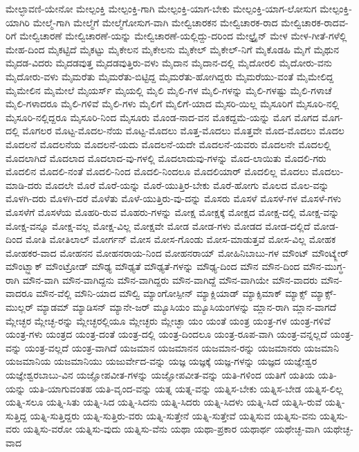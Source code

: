 {ಮೇಲ್ಛಾವಣಿ-ಯೇನೋ
ಮೇಲ್ಪಂಕ್ತಿ
ಮೇಲ್ಪಂಕ್ತಿ-ಗಾಗಿ
ಮೇಲ್ಪಂಕ್ತಿ-ಯಾಗ-ಬೇಕು
ಮೇಲ್ಪಂಕ್ತಿ-ಯಾಗ-ಲೋಸುಗ
ಮೇಲ್ಪಂಕ್ತಿ-ಯಾಗಿರಿ
ಮೇಲ್ಮೆ-ಗಾಗಿ
ಮೇಲ್ಮೆಗೆ
ಮೇಲ್ಮೆಗೋಸುಗ-ವಾಗಿ
ಮೇಲ್ವಿಚಾರಕನ
ಮೇಲ್ವಿಚಾರಕ-ರಾದ
ಮೇಲ್ವಿಚಾರಕ-ರಾದವ-ರಿಗೆ
ಮೇಲ್ವಿಚಾರಣೆ
ಮೇಲ್ವಿಚಾರಣೆ-ಯನ್ನು
ಮೇಲ್ವಿಚಾರಣೆ-ಯಲ್ಲಿದ್ದು-ದರಿಂದ
ಮೇಲ್ಟ್ರೈನ್
ಮೇಳ
ಮೇಳ-ಗೀತೆ-ಗಳೆಲ್ಲಿ
ಮೇಹ-ದಿಂದ
ಮೈಕಟ್ಟಿದೆ
ಮೈಕಟ್ಟು
ಮೈಕೇಲನ
ಮೈಕೇಲನು
ಮೈಕೇಲ್
ಮೈಕೇಲ್-ನಿಗೆ
ಮೈಕೊಡಹಿ
ಮೈಗೆ
ಮೈಥುನ
ಮೈದಡ-ವಿದರು
ಮೈದಡವುತ್ತ
ಮೈದಡವುತ್ತಿರು-ವಳು
ಮೈದಾನ
ಮೈದಾನ-ದಲ್ಲಿ
ಮೈದೋರಲಿ
ಮೈದೋರು-ವನು
ಮೈದೋರು-ವಳು
ಮೈಮರೆತು
ಮೈಮರೆತು-ಬಿಟ್ಟಿದ್ದ
ಮೈಮರೆತು-ಹೋಗಿದ್ದರು
ಮೈಮರೆಯು-ವಂತೆ
ಮೈಮೇಲಿದ್ದ
ಮೈಮೇಲಿನ
ಮೈಮೇಲೆ
ಮೈಯರ್ಸ್
ಮೈಯಲ್ಲಿ
ಮೈಲಿ
ಮೈಲಿ-ಗಳ
ಮೈಲಿ-ಗಳನ್ನು
ಮೈಲಿ-ಗಳಷ್ಟು
ಮೈಲಿ-ಗಳಾಚೆ
ಮೈಲಿ-ಗಳಾದರೂ
ಮೈಲಿ-ಗಳಿವೆ
ಮೈಲಿ-ಗಳು
ಮೈಲಿಗೆ
ಮೈಲಿಗೆ-ಯಾದ
ಮೈಸರಿ-ಯಿಲ್ಲ
ಮೈಸೂರಿಗೆ
ಮೈಸೂರಿ-ನಲ್ಲಿ
ಮೈಸೂರಿ-ನಲ್ಲಿದ್ದರೂ
ಮೈಸೂರಿ-ನಿಂದ
ಮೈಸೂರು
ಮೊಂಡ-ನಾದ-ವನ
ಮೊಕದ್ದಮೆ-ಯನ್ನು
ಮೊಗ
ಮೊಗದ
ಮೊಗ-ದಲ್ಲಿ
ಮೊಗಲರ
ಮೊಟ್ಟ-ಮೊದಲ-ನೆಯ
ಮೊಟ್ಟ-ಮೊದಲು
ಮೊತ್ತ-ಮೊದಲು
ಮೊತ್ತವೇ
ಮೊದ-ಮೊದಲು
ಮೊದಲ
ಮೊದಲನೆ
ಮೊದಲನೆಯ
ಮೊದಲನೆ-ಯದು
ಮೊದಲನೆ-ಯದೇ
ಮೊದಲನೆ-ಯವರು
ಮೊದಲನೇ
ಮೊದಲಲ್ಲಿ
ಮೊದಲಾಗಿದೆ
ಮೊದಲಾದ
ಮೊದಲಾದ-ವು-ಗಳಲ್ಲಿ
ಮೊದಲಾದುವು-ಗಳನ್ನು
ಮೊದ-ಲಾಯಿತು
ಮೊದಲಿ-ಗರು
ಮೊದಲಿನ
ಮೊದಲಿ-ನಂತೆ
ಮೊದಲಿ-ನಿಂದ
ಮೊದಲಿ-ನಿಂದಲೂ
ಮೊದಲಿಯಾರ್
ಮೊದಲಿಲ್ಲ
ಮೊದಲು
ಮೊದಲು-ಮಾಡಿ-ದರು
ಮೊದಲೇ
ಮೊರೆ
ಮೊರೆ-ಯನ್ನು
ಮೊರೆ-ಯುತ್ತಿರ-ಬೇಕು
ಮೊರೆ-ಹೋಗು
ಮೊಲದ
ಮೊಲ-ವನ್ನು
ಮೊಳಗಿ-ದರು
ಮೊಳಗಿ-ದರೆ
ಮೊಳೆತು
ಮೊಳೆ-ಯುತ್ತಿರು-ವು-ದನ್ನು
ಮೊಸರು
ಮೊಸಳೆ
ಮೊಸಳೆ-ಗಳ
ಮೊಸಳೆ-ಗಳು
ಮೊಸಳೆಗೆ
ಮೊಸಳೆಯ
ಮೊಹರಿ-ರುವ
ಮೊಹರು-ಗಳನ್ನು
ಮೋಕ್ಷ
ಮೋಕ್ಷಕ್ಕೆ
ಮೋಕ್ಷದ
ಮೋಕ್ಷ-ದಲ್ಲಿ
ಮೋಕ್ಷ-ವನ್ನು
ಮೋಕ್ಷ-ವನ್ನೂ
ಮೋಕ್ಷ-ವಲ್ಲ
ಮೋಕ್ಷ-ವಿಲ್ಲ
ಮೋಕ್ಷವೇ
ಮೋಡ
ಮೋಡ-ಗಳು
ಮೋಡದ
ಮೋಡ-ದಲ್ಲಿದೆ
ಮೋಡ-ದಿಂದ
ಮೋತಿ
ಮೋತಿಲಾಲ್
ಮೋರ್ಗನ್
ಮೋಸ
ಮೋಸ-ಗೊಂಡು
ಮೋಸ-ಮಾಡುತ್ತವೆ
ಮೋಸ-ವಿಲ್ಲ
ಮೋಹಕ
ಮೋಹಕರ-ವಾದ
ಮೋಹನನ
ಮೋಹನರಾಯ-ನಿಂದ
ಮೋಹನರಾಯ್
ಮೋಹಿನಿಬಾಬು-ಗಳ
ಮೌಂಟ್
ಮೌಂಟ್ಕ್ಲೇರ್
ಮೌಂಟ್ಬ್ಲಾಕ್
ಮೌಂಟ್ರೋಡ್
ಮೌಢ್ಯ
ಮೌಢ್ಯತೆ
ಮೌಢ್ಯತೆ-ಗಳನ್ನು
ಮೌಢ್ಯ-ದಿಂದ
ಮೌನ
ಮೌನ-ದಿಂದ
ಮೌನ-ಮುಗ್ಧ-ರಾಗಿ
ಮೌನ-ವಾಗಿ
ಮೌನ-ವಾಗಿದ್ದನು
ಮೌನ-ವಾಗಿದ್ದರು
ಮೌನ-ವಾಗಿದ್ದೆ
ಮೌನ-ವಾಗಿಯೇ
ಮೌನ-ವಾದರು
ಮೌನ-ವಾದರೂ
ಮೌನ-ವೆಲ್ಲಿ
ಮೌನಿ-ಯಾದ
ಮೌಲ್ವಿ
ಮ್ಯಾಂಗೋಸ್ಪೀನ್
ಮ್ಯಾಕ್ಲಿಯಾಡ್
ಮ್ಯಾಕ್ಸಿಮಾಕ್
ಮ್ಯಾಕ್ಸ್
ಮ್ಯಾಕ್ಸ್-ಮುಲ್ಲರ್
ಮ್ಯಾಡಮ್
ಮ್ಯಾಡಿಸನ್
ಮ್ಯಾನೇ-ಜರ್
ಮ್ಯೂಸಿಯಂ
ಮ್ಯೂಸಿಯಂಗಳನ್ನು
ಮ್ಲಾನ-ರಾಗಿ
ಮ್ಲಾನ-ವಾಗದೆ
ಮ್ಲೇಚ್ಛರ
ಮ್ಲೇಚ್ಛ-ರನ್ನು
ಮ್ಲೇಚ್ಛರಲ್ಲಿಯೂ
ಮ್ಲೇಚ್ಛರು
ಮ್ಲೇಚ್ಛಾ
ಯಂ
ಯಂತೆ
ಯಂತ್ರ
ಯಂತ್ರ-ಗಳ
ಯಂತ್ರ-ಗಳಿವೆ
ಯಂತ್ರ-ಗಳು
ಯಂತ್ರದ
ಯಂತ್ರ-ದಂತೆ
ಯಂತ್ರ-ದಲ್ಲಿ
ಯಂತ್ರ-ದಿಂದಲೂ
ಯಂತ್ರ-ರೂಪ-ವಾಗಿ
ಯಂತ್ರ-ವನ್ನಲ್ಲದೆ
ಯಂತ್ರ-ವನ್ನು
ಯಂತ್ರ-ವಲ್ಲದೆ
ಯಂತ್ರ-ವಾಗಿದೆ
ಯಜಮಾನ
ಯಜಮಾನನ
ಯಜಮಾನ-ರನ್ನು
ಯಜಮಾನರು
ಯಜಮಾನಿ
ಯಜಮಾನಿಯ
ಯಜಮಾನಿಯು
ಯಜುರ್ವೇದ-ವನ್ನು
ಯಜ್ಞ
ಯಜ್ಞಕ್ಕೆ
ಯಜ್ಞ-ಗಳನ್ನು
ಯಜ್ಞದ
ಯಜ್ಞೇಶ್ವರ
ಯಜ್ಞೇಶ್ವರಬಾಬು-ವಿನ
ಯಜ್ಞೋಪವೀತ-ಗಳನ್ನು
ಯಜ್ಞೋಪವೀತ-ವನ್ನು
ಯತಿ-ಗಳಿಂದ
ಯತಿಗೆ
ಯತಿಯ
ಯತಿ-ಯನ್ನು
ಯತಿ-ಯಾಗುವಂತಹ
ಯತಿ-ವೃಂದ-ವನ್ನು
ಯತ್ನ
ಯತ್ನ-ವನ್ನು
ಯತ್ನಿಸ-ಬೇಕು
ಯತ್ನಿಸ-ಬೇಡ
ಯತ್ನಿಸ-ಲಿಲ್ಲ
ಯತ್ನಿ-ಸಲೂ
ಯತ್ನಿ-ಸಿತು
ಯತ್ನಿ-ಸಿದ
ಯತ್ನಿ-ಸಿದನು
ಯತ್ನಿ-ಸಿದರು
ಯತ್ನಿ-ಸಿದಳು
ಯತ್ನಿ-ಸಿದೆ
ಯತ್ನಿಸಿ-ರುವೆ
ಯತ್ನಿ-ಸುತ್ತಿದ್ದ
ಯತ್ನಿ-ಸುತ್ತಿದ್ದರು
ಯತ್ನಿ-ಸುತ್ತಿರು-ವರು
ಯತ್ನಿ-ಸುತ್ತೇನೆ
ಯತ್ನಿ-ಸುತ್ತೇವೆ
ಯತ್ನಿಸುವ
ಯತ್ನಿಸು-ವನು
ಯತ್ನಿಸು-ವರು
ಯತ್ನಿಸು-ವರೋ
ಯತ್ನಿಸು-ವುದು
ಯತ್ನಿಸು-ವೆನು
ಯಥಾ
ಯಥಾ-ಪ್ರಕಾರ
ಯಥಾರ್ಥ
ಯಥೇಚ್ಛ-ವಾಗಿ
ಯಥೇಚ್ಛ-ವಾದ
}
